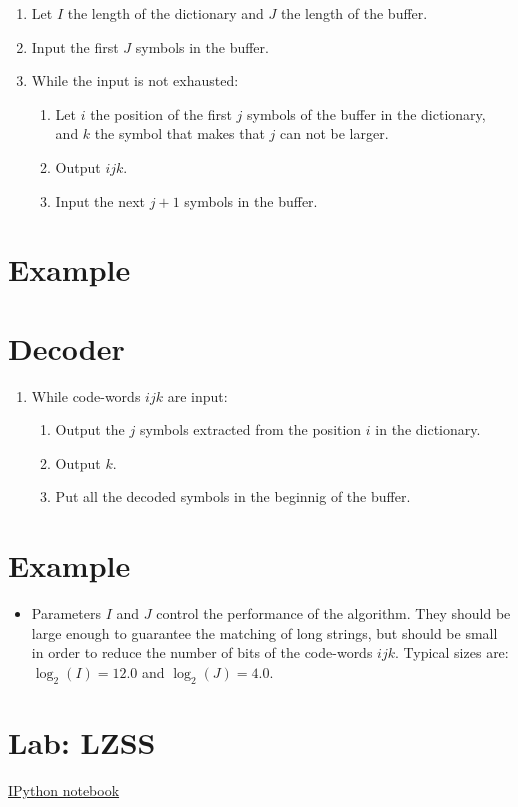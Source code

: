 \begin{enumerate}
\tightlist
\item
  Let \(I\) the length of the dictionary and \(J\) the length of the
  buffer.
\item
  Input the first \(J\) symbols in the buffer.
\item
  While the input is not exhausted:

  \begin{enumerate}
  \tightlist
  \item
    Let \(i\) the position of the first \(j\) symbols of the buffer in
    the dictionary, and \(k\) the symbol that makes that \(j\) can not
    be larger.
  \item
    Output \(ijk\).
  \item
    Input the next \(j+1\) symbols in the buffer.
  \end{enumerate}
\end{enumerate}

\section*{Example}

\section{Decoder}

\begin{enumerate}
\tightlist
\item
  While code-words \(ijk\) are input:

  \begin{enumerate}
  \tightlist
  \item
    Output the \(j\) symbols extracted from the position \(i\) in the
    dictionary.
  \item
    Output \(k\).
  \item
    Put all the decoded symbols in the beginnig of the buffer.
  \end{enumerate}
\end{enumerate}

\section*{Example}
\begin{itemize}
\tightlist
\item
  Parameters \(I\) and \(J\) control the performance of the algorithm.
  They should be large enough to guarantee the matching of long strings,
  but should be small in order to reduce the number of bits of the
  code-words \(ijk\). Typical sizes are: \(\log_2(I)=12.0\) and
  \(\log_2(J)=4.0\).
\end{itemize}

\section{Lab: LZSS}
\href{https://nbviewer.jupyter.org/github/vicente-gonzalez-ruiz/LZ77/blob/master/LZSS.ipynb}{IPython notebook}


